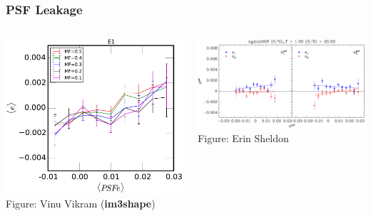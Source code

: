 \documentclass{beamer}
\newcommand{\imshape}{{\bf im3shape}}
\begin{document}
\frame
{
    \frametitle{PSF Leakage}

    \begin{columns}
        \begin{column}{0.38\textwidth}
            \begin{center}
                \includegraphics[width=\textwidth]{im3shape-PSF-E1.pdf}
                \newline
                {\tiny Figure: Vinu Vikram (\imshape)}
            \end{center}
        \end{column}
        \begin{column}{0.62\textwidth}
            \begin{center}
            \includegraphics[width=\textwidth]{ngmix009-e-vs-epsf-Ts2n-min-1-s2n-min-20.pdf}
                \newline
                {\tiny Figure: Erin Sheldon}
            \end{center}
        \end{column}
    \end{columns}
}
\end{document}
